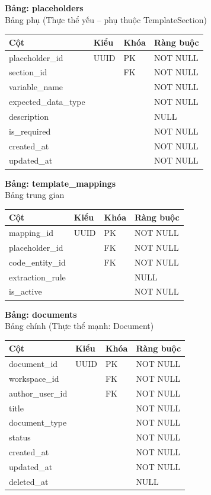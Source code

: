 \textbf{Bảng: placeholders}\\
Bảng phụ (Thực thể yếu – phụ thuộc TemplateSection)
\begin{table}[H]
\centering
\begin{tabular}{|l|l|l|l|}
\hline
\textbf{Cột} & \textbf{Kiểu} & \textbf{Khóa} & \textbf{Ràng buộc} \\ \hline
placeholder\_id & UUID & PK & NOT NULL \\ \hline
section\_id & & FK & NOT NULL \\ \hline
variable\_name & & & NOT NULL \\ \hline
expected\_data\_type & & & NOT NULL \\ \hline
description & & & NULL \\ \hline
is\_required & & & NOT NULL \\ \hline
created\_at & & & NOT NULL \\ \hline
updated\_at & & & NOT NULL \\ \hline
\end{tabular}
\end{table}

\textbf{Bảng: template\_mappings}\\
Bảng trung gian
\begin{table}[H]
\centering
\begin{tabular}{|l|l|l|l|}
\hline
\textbf{Cột} & \textbf{Kiểu} & \textbf{Khóa} & \textbf{Ràng buộc} \\ \hline
mapping\_id & UUID & PK & NOT NULL \\ \hline
placeholder\_id & & FK & NOT NULL \\ \hline
code\_entity\_id & & FK & NOT NULL \\ \hline
extraction\_rule & & & NULL \\ \hline
is\_active & & & NOT NULL \\ \hline
\end{tabular}
\end{table}
\textbf{Bảng: documents}\\
Bảng chính (Thực thể mạnh: Document)
\begin{table}[H]
\centering
\begin{tabular}{|l|l|l|l|}
\hline
\textbf{Cột} & \textbf{Kiểu} & \textbf{Khóa} & \textbf{Ràng buộc} \\ \hline
document\_id & UUID & PK & NOT NULL \\ \hline
workspace\_id & & FK & NOT NULL \\ \hline
author\_user\_id & & FK & NOT NULL \\ \hline
title & & & NOT NULL \\ \hline
document\_type & & & NOT NULL \\ \hline
status & & & NOT NULL \\ \hline
created\_at & & & NOT NULL \\ \hline
updated\_at & & & NOT NULL \\ \hline
deleted\_at & & & NULL \\ \hline
\end{tabular}
\end{table}

